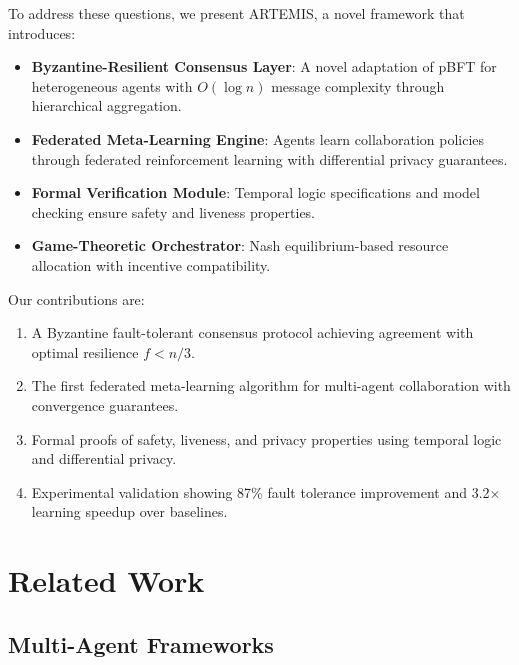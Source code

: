 \documentclass[conference]{IEEEtran}
\begin{document}
To address these questions, we present ARTEMIS, a novel framework that introduces:

\begin{itemize}
    \item \textbf{Byzantine-Resilient Consensus Layer}: A novel adaptation of pBFT for heterogeneous agents with $O(\log n)$ message complexity through hierarchical aggregation.
    
    \item \textbf{Federated Meta-Learning Engine}: Agents learn collaboration policies through federated reinforcement learning with differential privacy guarantees.
    
    \item \textbf{Formal Verification Module}: Temporal logic specifications and model checking ensure safety and liveness properties.
    
    \item \textbf{Game-Theoretic Orchestrator}: Nash equilibrium-based resource allocation with incentive compatibility.
\end{itemize}

Our contributions are:

\begin{enumerate}
    \item A Byzantine fault-tolerant consensus protocol achieving agreement with optimal resilience $f < n/3$.
    
    \item The first federated meta-learning algorithm for multi-agent collaboration with convergence guarantees.
    
    \item Formal proofs of safety, liveness, and privacy properties using temporal logic and differential privacy.
    
    \item Experimental validation showing 87\% fault tolerance improvement and 3.2× learning speedup over baselines.
\end{enumerate}

\section{Related Work}

\subsection{Multi-Agent Frameworks}
\end{document}
